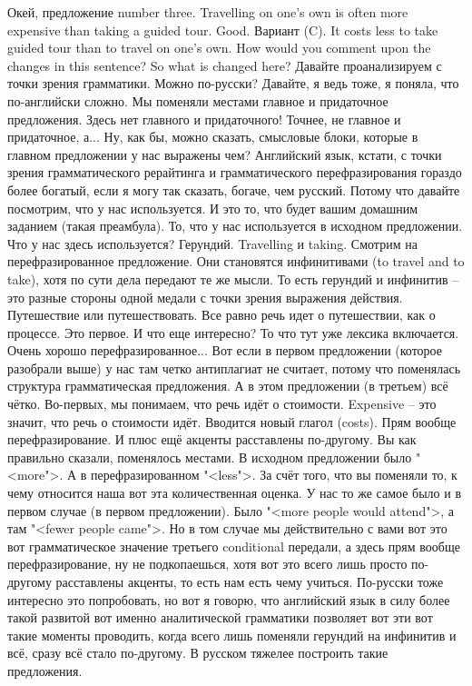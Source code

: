 \documentclass[main.tex]{subfiles}
\begin{document}
Окей, предложение number three.
Travelling on one's own is often more expensive than taking a guided tour.
Good.
Вариант (C).
It costs less to take guided tour than to travel on one's own.
How would you comment upon the changes in this sentence?
So what is changed here?
Давайте проанализируем с точки зрения грамматики.
Можно по-русски?
Давайте, я ведь тоже, я поняла, что по-английски сложно.
Мы поменяли местами главное и придаточное предложения.
Здесь нет главного и придаточного!
Точнее, не главное и придаточное, а...
Ну, как бы, можно сказать, смысловые блоки, которые в главном предложении у нас выражены чем?
Английский язык, кстати, с точки зрения грамматического рерайтинга и грамматического перефразирования гораздо более богатый, если я могу так сказать, богаче, чем русский.
Потому что давайте посмотрим, что у нас используется.
И это то, что будет вашим домашним заданием (такая преамбула).
То, что у нас используется в исходном предложении.
Что у нас здесь используется?
Герундий.
Travelling и taking.
Смотрим на перефразированное предложение.
Они становятся инфинитивами (to travel and to take), хотя по сути дела передают те же мысли.
То есть герундий и инфинитив -- это разные стороны одной медали с точки зрения выражения действия.
Путешествие или путешествовать.
Все равно речь идет о путешествии, как о процессе.
Это первое.
И что еще интересно?
То что тут уже лексика включается.
Очень хорошо перефразированное...
Вот если в первом предложении (которое разобрали выше) у нас там четко антиплагиат не считает, потому что поменялась структура грамматическая предложения.
А в этом предложении (в третьем) всё чётко.
Во-первых, мы понимаем, что речь идёт о стоимости.
Expensive -- это значит, что речь о стоимости идёт.
Вводится новый глагол (costs).
Прям вообще перефразирование.
И плюс ещё акценты расставлены по-другому.
Вы как правильно сказали, поменялось местами.
В исходном предложении было "<more">.
А в перефразированном "<less">.
За счёт того, что вы поменяли то, к чему относится наша вот эта количественная оценка.
У нас то же самое было и в первом случае (в первом предложении).
Было "<more people would attend">, а там "<fewer people came">.
Но в том случае мы действительно с вами вот это вот грамматическое значение третьего conditional передали, а здесь прям вообще перефразирование, ну не подкопаешься, хотя вот это всего лишь просто по-другому расставлены акценты, то есть нам есть чему учиться.
По-русски тоже интересно это попробовать, но вот я говорю, что английский язык в силу более такой развитой вот именно аналитической грамматики позволяет вот эти вот такие моменты проводить, когда всего лишь поменяли герундий на инфинитив и всё, сразу всё стало по-другому.
В русском тяжелее построить такие предложения.
\end{document}
